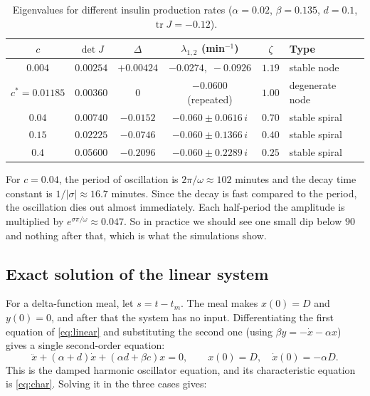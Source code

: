 \documentclass[11pt,a4paper]{article}
\newcommand{\cs}{c^{*}}
\begin{document}
\begin{table}[H]
\centering
\caption{Eigenvalues for different insulin production rates ($\alpha=0.02$, $\beta=0.135$, $d=0.1$, $\operatorname{tr}J=-0.12$).}
\label{tab:eig}
\begin{tabular}{cccccl}
\toprule
$c$ & $\det J$ & $\Delta$ & $\lambda_{1,2}$ (min$^{-1}$) & $\zeta$ & Type \\
\midrule
$0.004$ & $0.00254$ & $+0.00424$ & $-0.0274,\;-0.0926$ & $1.19$ & stable node \\
$\cs=0.01185$ & $0.00360$ & $0$ & $-0.0600$ (repeated) & $1.00$ & degenerate node \\
$0.04$ & $0.00740$ & $-0.0152$ & $-0.060\pm0.0616\,i$ & $0.70$ & stable spiral \\
$0.15$ & $0.02225$ & $-0.0746$ & $-0.060\pm0.1366\,i$ & $0.40$ & stable spiral \\
$0.4$ & $0.05600$ & $-0.2096$ & $-0.060\pm0.2289\,i$ & $0.25$ & stable spiral \\
\bottomrule
\end{tabular}
\end{table}

For $c=0.04$, the period of oscillation is $2\pi/\omega\approx102$ minutes and the decay time constant is $1/|\sigma|\approx16.7$ minutes. Since the decay is fast compared to the period, the oscillation dies out almost immediately. Each half-period the amplitude is multiplied by $e^{\sigma\pi/\omega}\approx0.047$. So in practice we should see one small dip below $90$ and nothing after that, which is what the simulations show.

\subsection{Exact solution of the linear system}
For a delta-function meal, let $s=t-t_m$. The meal makes $x(0)=D$ and $y(0)=0$, and after that the system has no input. Differentiating the first equation of \eqref{eq:linear} and substituting the second one (using $\beta y=-\dot x-\alpha x$) gives a single second-order equation:
\begin{equation}\label{eq:second}
\ddot x+(\alpha+d)\dot x+(\alpha d+\beta c)x=0,\qquad x(0)=D,\quad \dot x(0)=-\alpha D .
\end{equation}
This is the damped harmonic oscillator equation, and its characteristic equation is \eqref{eq:char}. Solving it in the three cases gives:
\end{document}
